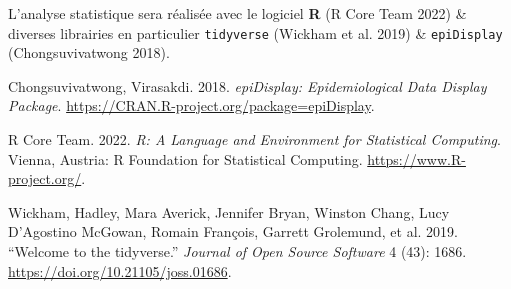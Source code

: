 L'analyse statistique sera réalisée avec le logiciel \textbf{R} {(R Core
Team 2022)} \& diverses librairies en particulier \texttt{tidyverse}
{(Wickham et al. 2019)} \& \texttt{epiDisplay} {(Chongsuvivatwong
2018)}.

\hypertarget{refs}{}
\begin{cslreferences}
\hypertarget{ref-epid}{}
Chongsuvivatwong, Virasakdi. 2018. \emph{epiDisplay: Epidemiological
Data Display Package}.
\url{https://CRAN.R-project.org/package=epiDisplay}.

\hypertarget{ref-rstat}{}
R Core Team. 2022. \emph{R: A Language and Environment for Statistical
Computing}. Vienna, Austria: R Foundation for Statistical Computing.
\url{https://www.R-project.org/}.

\hypertarget{ref-tidy}{}
Wickham, Hadley, Mara Averick, Jennifer Bryan, Winston Chang, Lucy
D'Agostino McGowan, Romain François, Garrett Grolemund, et al. 2019.
{``Welcome to the {tidyverse}.''} \emph{Journal of Open Source Software}
4 (43): 1686. \url{https://doi.org/10.21105/joss.01686}.
\end{cslreferences}
